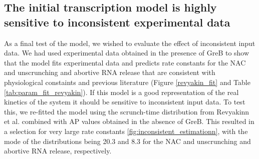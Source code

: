 \subsection{The initial transcription model is highly sensitive to
inconsistent experimental data}
As a final test of the model, we wished to evaluate the effect of
inconsistent input data. We had used experimental data obtained in the
presence of GreB to show that the model fits experimental data and predicts
rate constants for the NAC and unscrunching and abortive RNA release that are
consistent with physiological constaints and previous literature (Figure
\ref{revyakin_fit} and Table \ref{tab:param_fit_revyakin}). If this model is a
good representation of the real kinetics of the system it should be sensitive
to inconsistent input data. To test this, we re-fitted the model using the
scrunch-time distribution from Revyakinn et al. combined with AP values
obtained in the absence of GreB. This resulted in a selection for very large
rate constants \ref{fig:inconsistent_estimationn}, with the mode of the
distributions being 20.3 and 8.3 for the NAC and unscrunching and abortive RNA
release, respectively.
  


